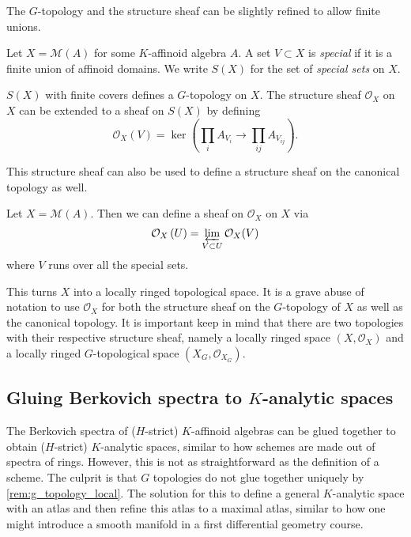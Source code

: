 The $G$-topology and the structure sheaf can be slightly refined to allow finite unions. 
\begin{definition}
	Let $X = \mathcal{M} (A)$ for some $K$-affinoid algebra $A$. 
	A set $V\subset  X$ is \emph{special} if it is a finite union of affinoid domains. 
	We write $S(X)$ for the set of \emph{special sets} on $X$. 
\end{definition}

\begin{definition}
	$S(X)$ with finite covers defines a $G$-topology on $X$. 
	The structure sheaf  $\mathcal{O}_X$ on $X$ can be extended to a sheaf on $S(X)$ by defining \[
		\mathcal{O}_X(V) = \ker\left(\prod_i A_{V_i} \to \prod_{ij} A_{V_{ij}}\right)
	.\] 
\end{definition}


This structure sheaf can also be used to define a structure sheaf on the canonical topology as well. 
\begin{definition}\label{def:structuresheaf_cannonical_topology}
	Let $X = \mathcal{M} (A)$. Then we can define a sheaf on $\mathcal{O}_X$ on $X$ via \[
		\mathcal{O}_X\left( U \right)  = \varprojlim_{V \subset U} \mathcal{O}_X(V)
	\]   
	where $V$ runs over all the special sets.
\end{definition}
This turns $X$ into a locally ringed topological space. 
It is a grave abuse of notation to use $\mathcal{O}_X$ for both the structure sheaf on the $G$-topology of $X$ as well as the canonical topology. 
It is important keep in mind that there are two topologies with their respective structure sheaf, namely a locally ringed space $(X, \mathcal{O}_X)$ and a locally ringed $G$-topological space $(X_G, \mathcal{O}_{X_G})$. 



\subsection{Gluing Berkovich spectra to $K$-analytic spaces} \label{sec:gluing_berkovich_spectra_to_k_analytic_spaces}


The Berkovich spectra of ($H$-strict) $K$-affinoid algebras can be glued together to obtain ($H$-strict) $K$-analytic spaces, similar to how schemes are made out of spectra of rings. 
However, this is not as straightforward as the definition of a scheme. 
The culprit is that $G$ topologies do not glue together uniquely by \cref{rem:g_topology_local}. 
The solution for this to define a general $K$-analytic space with an atlas and then refine this atlas to a maximal atlas, similar to how one might introduce a smooth manifold in a first differential geometry course. 

